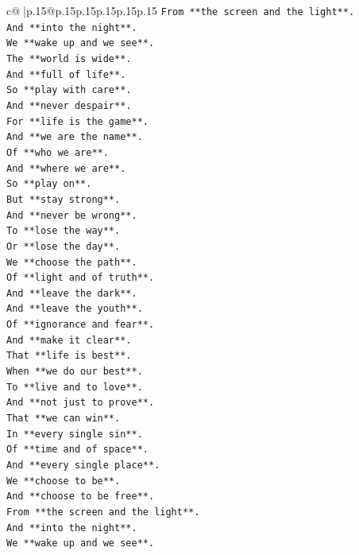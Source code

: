 \documentclass{article}
\begin{document}
{\begin{supertabular}{c@{$\;$}|p{.15\linewidth}@{}p{.15\linewidth}p{.15\linewidth}p{.15\linewidth}p{.15\linewidth}p{.15\linewidth}}
{{{\texttt{From **the screen and the light**.} \\
\texttt{And **into the night**.} \\
\texttt{We **wake up and we see**.} \\
\texttt{The **world is wide**.} \\
\texttt{And **full of life**.} \\
\texttt{So **play with care**.} \\
\texttt{And **never despair**.} \\
\texttt{For **life is the game**.} \\
\texttt{And **we are the name**.} \\
\texttt{Of **who we are**.} \\
\texttt{And **where we are**.} \\
\texttt{So **play on**.} \\
\texttt{But **stay strong**.} \\
\texttt{And **never be wrong**.} \\
\texttt{To **lose the way**.} \\
\texttt{Or **lose the day**.} \\
\texttt{We **choose the path**.} \\
\texttt{Of **light and of truth**.} \\
\texttt{And **leave the dark**.} \\
\texttt{And **leave the youth**.} \\
\texttt{Of **ignorance and fear**.} \\
\texttt{And **make it clear**.} \\
\texttt{That **life is best**.} \\
\texttt{When **we do our best**.} \\
\texttt{To **live and to love**.} \\
\texttt{And **not just to prove**.} \\
\texttt{That **we can win**.} \\
\texttt{In **every single sin**.} \\
\texttt{Of **time and of space**.} \\
\texttt{And **every single place**.} \\
\texttt{We **choose to be**.} \\
\texttt{And **choose to be free**.} \\
\texttt{From **the screen and the light**.} \\
\texttt{And **into the night**.} \\
\texttt{We **wake up and we see**.} \\
}}}
\end{supertabular}}
\end{document}
